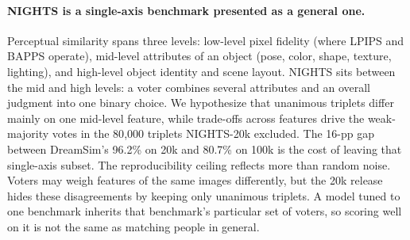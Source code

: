\documentclass{article}
\begin{document}
\paragraph{NIGHTS is a single-axis benchmark presented as a general one.} Perceptual similarity spans three levels: low-level pixel fidelity (where LPIPS and BAPPS operate), mid-level attributes of an object (pose, color, shape, texture, lighting), and high-level object identity and scene layout. NIGHTS sits between the mid and high levels: a voter combines several attributes and an overall judgment into one binary choice. We hypothesize that unanimous triplets differ mainly on one mid-level feature, while trade-offs across features drive the weak-majority votes in the 80{,}000 triplets NIGHTS-20k excluded. The 16-pp gap between DreamSim's 96.2\% on 20k and 80.7\% on 100k is the cost of leaving that single-axis subset. The reproducibility ceiling reflects more than random noise. Voters may weigh features of the same images differently, but the 20k release hides these disagreements by keeping only unanimous triplets. A model tuned to one benchmark inherits that benchmark's particular set of voters, so scoring well on it is not the same as matching people in general. 
\end{document}
